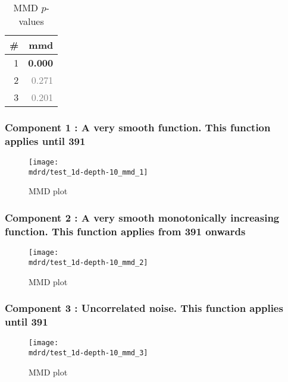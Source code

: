 \documentclass{article} %
\begin{document}
\begin{table}[htb]
\begin{center}
{\small
\begin{tabular}{|r|r|}
\hline
\bf{\#} & {mmd}\\
\hline

1 & \textbf{0.000}\\

2 & \textcolor{gray}{0.271}\\

3 & \textcolor{gray}{0.201}\\

\hline
\end{tabular}
\caption{
MMD $p$-values
}
\label{table:mmd}
}
\end{center}
\end{table}

\subsubsection{Component 1 : A very smooth function. This function applies until  391}

\begin{figure}[H]
\newcommand{\wmgd}{0.5\columnwidth}
\newcommand{\hmgd}{3.0cm}
\newcommand{\mdrd}{test_1d-depth-10}
\newcommand{\mbm}{\hspace{-0.3cm}}
\texttt{[image: \\mdrd/test\_1d-depth-10\_mmd\_1]}
\caption{
MMD plot}
\label{fig:mmd1}
\end{figure}

\subsubsection{Component 2 : A very smooth monotonically increasing function. This function applies from  391 onwards}

\begin{figure}[H]
\newcommand{\wmgd}{0.5\columnwidth}
\newcommand{\hmgd}{3.0cm}
\newcommand{\mdrd}{test_1d-depth-10}
\newcommand{\mbm}{\hspace{-0.3cm}}
\texttt{[image: \\mdrd/test\_1d-depth-10\_mmd\_2]}
\caption{
MMD plot}
\label{fig:mmd2}
\end{figure}

\subsubsection{Component 3 : Uncorrelated noise. This function applies until  391}

\begin{figure}[H]
\newcommand{\wmgd}{0.5\columnwidth}
\newcommand{\hmgd}{3.0cm}
\newcommand{\mdrd}{test_1d-depth-10}
\newcommand{\mbm}{\hspace{-0.3cm}}
\texttt{[image: \\mdrd/test\_1d-depth-10\_mmd\_3]}
\caption{
MMD plot}
\label{fig:mmd3}
\end{figure}
\end{document}
